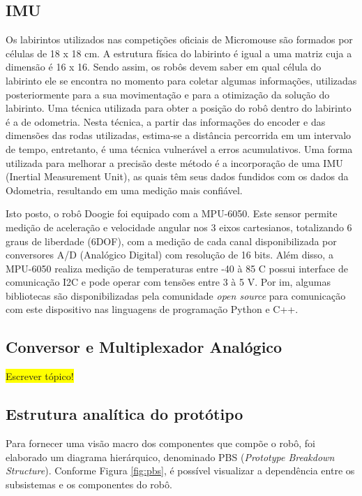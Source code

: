\subsection{IMU}
\label{ssec:imu}
Os labirintos utilizados nas competições oficiais de Micromouse são formados por células de 18 x 18 cm. A estrutura física do labirinto é igual a uma matriz cuja a dimensão é 16 x 16. Sendo assim, os robôs devem saber em qual célula do labirinto ele se encontra no momento para coletar algumas informações, utilizadas posteriormente para a sua movimentação e para a otimização da solução do labirinto. Uma técnica utilizada para obter a posição do robô dentro do labirinto é a de odometria. Nesta técnica, a partir das informações do encoder e das dimensões das rodas utilizadas, estima-se a distância percorrida em um intervalo de tempo, entretanto, é uma técnica vulnerável a erros acumulativos. Uma forma utilizada para melhorar a precisão deste método é a incorporação de uma IMU (Inertial Measurement Unit), as quais têm seus dados fundidos com os dados da Odometria, resultando em uma medição mais confiável.

Isto posto, o robô Doogie foi equipado com a MPU-6050. Este sensor permite medição de aceleração e velocidade angular nos 3 eixos cartesianos, totalizando 6 graus de liberdade (6DOF), com a medição de cada canal disponibilizada por conversores A/D (Analógico Digital) com resolução de 16 bits. Além disso, a MPU-6050 realiza medição de temperaturas entre -40 à 85 \textdegree C possui interface de comunicação I2C e pode operar com tensões entre 3 à 5 V. Por im, algumas bibliotecas são disponibilizadas pela comunidade \textit{open source} para comunicação com este dispositivo nas linguagens de programação Python e C++.

\subsection{Conversor e Multiplexador Analógico}
\label{conversor_multiplexador_analogico}
\colorbox{yellow}{Escrever tópico!}

\subsection{Estrutura analítica do protótipo}
\label{ssec:pbs}
Para fornecer uma visão macro dos componentes que compõe o robô, foi elaborado um diagrama hierárquico, denominado PBS (\textit{Prototype Breakdown Structure}). Conforme Figura \ref{fig:pbs}, é possível visualizar a dependência entre os subsistemas e os componentes do robô.

